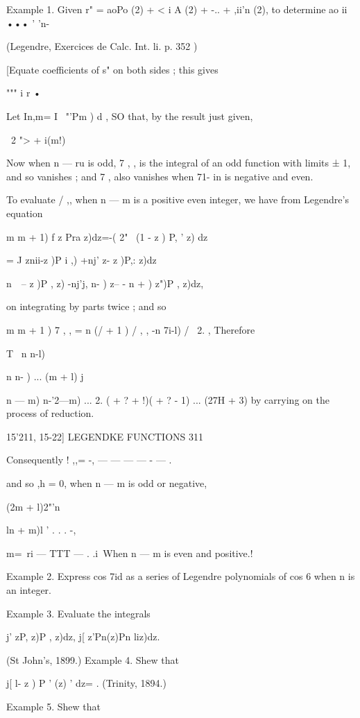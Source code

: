 {Example 1. Given r" = aoPo (2) + < i A (2) + -.. + ,ii'n (2), to
determine ao ii ••• ' 'n-

(Legendre, Exercices de Calc. Int. li. p. 352 )

[Equate coefficients of s" on both sides ; this gives

""" i r •

Let In,m= I ~"'Pm ) d , SO that, by the result just given,

\ 2 "> + i(m!)

Now when n — ru is odd, 7 , , is the integral of an odd function with
limits ± 1, and so vanishes ; and 7 , also vanishes when 71- in is
negative and even.

To evaluate / ,, when n — m is a positive even integer, we have from
Legendre's equation

m m + 1) f z Pra z)dz=-( 2" \ (1 - z ) P, ' z) dz

= J znii-z )P i ,) +nj' z- z )P,: z)dz

  n\ \ -- z )P , z) -nj'j, n- ) z-- - n + ) z")P , z)dz,

on integrating by parts twice ; and so

m m + 1 ) 7 , , = n (/ + 1 ) / , , -n 7i-l) / \ 2. , Therefore



T \ n n-l)



n n- ) ... (m + l) j



 n — m) n-'2—m) ... 2. ( + ? + !)( + ? - 1) ... (27H + 3) by carrying
on the process of reduction.



15'211, 15-22] LEGENDKE FUNCTIONS 311

Consequently ! ,,= -, — — — — - — .

and so ,h = 0, when n — m is odd or negative,

(2m + l)2"'n\ \ {ln + m)l ' . . . -,

 m=~ri — TTT — . .i\, When n — m is even and positive.!

Example 2. Express cos 7id as a series of Legendre polynomials of cos
6 when n is an integer.

Example 3. Evaluate the integrals

j' zP, z)P , z)dz, j[ z'Pn(z)Pn liz)dz.

(St John's, 1899.) Example 4. Shew that

j[ l- z ) P ' (z) ' dz= . (Trinity, 1894.)

Example 5. Shew that

}}
